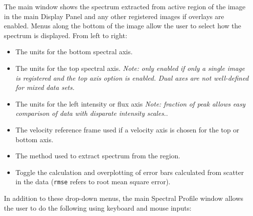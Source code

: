 The main window shows the spectrum extracted from active region of the image in the 
main Display Panel and any other registered images if overlays are enabled.  Menus
along the bottom of the image allow the user to select how the spectrum is displayed. From left to
right:

\begin{itemize}
\item The units for the bottom spectral axis.
\item The units for the top spectral axis. {\em Note: only enabled if only a single image is registered
and the top axis option is enabled. Dual axes are not well-defined for mixed data sets.}
\item The units for the left intensity or flux axis {\em Note: fraction of peak allows easy comparison of data
with disparate intensity scales.}.
\item The velocity reference frame used if a velocity axis is chosen for the top or bottom axis.
\item The method used to extract spectrum from the region.
\item Toggle the calculation and overplotting of error bars calculated from scatter in the data ({\tt rmse} refers
to root mean square error).
\end{itemize}


In addition to these drop-down menus, the main Spectral Profile window allows the user to do the following using keyboard and mouse inputs: %

